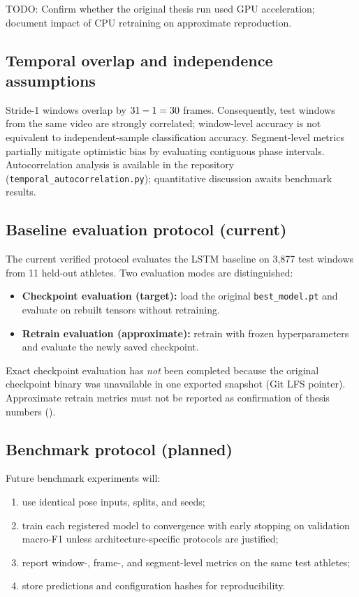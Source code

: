 \textsc{TODO:} Confirm whether the original thesis run used GPU acceleration; document impact of CPU retraining on approximate reproduction.

\subsection{Temporal overlap and independence assumptions}
\label{sec:protocol:overlap}

Stride-1 windows overlap by $31 - 1 = 30$ frames.
Consequently, test windows from the same video are strongly correlated; window-level accuracy is not equivalent to independent-sample classification accuracy.
Segment-level metrics partially mitigate optimistic bias by evaluating contiguous phase intervals.
Autocorrelation analysis is available in the repository (\texttt{temporal\_autocorrelation.py}); quantitative discussion awaits benchmark results.

\subsection{Baseline evaluation protocol (current)}
\label{sec:protocol:baseline}

The current verified protocol evaluates the \acs{LSTM} baseline on 3{,}877 test windows from 11 held-out athletes.
Two evaluation modes are distinguished:
\begin{itemize}
  \item \textbf{Checkpoint evaluation (target):} load the original \texttt{best\_model.pt} and evaluate on rebuilt tensors without retraining.
  \item \textbf{Retrain evaluation (approximate):} retrain with frozen hyperparameters and evaluate the newly saved checkpoint.
\end{itemize}
Exact checkpoint evaluation has \emph{not} been completed because the original checkpoint binary was unavailable in one exported snapshot (Git LFS pointer).
Approximate retrain metrics must not be reported as confirmation of thesis numbers ().

\subsection{Benchmark protocol (planned)}
\label{sec:protocol:benchmark}

Future benchmark experiments will:
\begin{enumerate}
  \item use identical pose inputs, splits, and seeds;
  \item train each registered model to convergence with early stopping on validation macro-F1 unless architecture-specific protocols are justified;
  \item report window-, frame-, and segment-level metrics on the same test athletes;
  \item store predictions and configuration hashes for reproducibility.
\end{enumerate}

